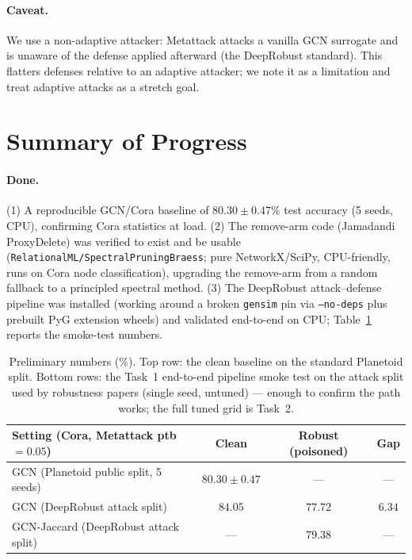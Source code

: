 \documentclass[10pt]{article}
\begin{document}
\paragraph{Caveat.} We use a non-adaptive attacker: Metattack attacks a vanilla GCN surrogate and is
unaware of the defense applied afterward (the DeepRobust standard). This flatters defenses relative to an
adaptive attacker; we note it as a limitation and treat adaptive attacks as a stretch goal.

\section{Summary of Progress}
\paragraph{Done.} (1) A reproducible GCN/Cora baseline of $\mathbf{80.30 \pm 0.47\%}$ test accuracy
(5 seeds, CPU), confirming Cora statistics at load. (2) The remove-arm code (Jamadandi ProxyDelete) was
verified to exist and be usable (\texttt{RelationalML/SpectralPruningBraess}; pure NetworkX/SciPy,
CPU-friendly, runs on Cora node classification), upgrading the remove-arm from a random fallback to a
principled spectral method. (3) The DeepRobust attack--defense pipeline was installed (working around a
broken \texttt{gensim} pin via \texttt{--no-deps} plus prebuilt PyG extension wheels) and validated
end-to-end on CPU; Table~\ref{tab:spike} reports the smoke-test numbers.

\begin{table}[h]
\centering
\small
\begin{tabular}{@{}lccc@{}}
\toprule
\textbf{Setting (Cora, Metattack ptb $=0.05$)} & \textbf{Clean} & \textbf{Robust (poisoned)} & \textbf{Gap} \\
\midrule
GCN (Planetoid public split, 5 seeds)  & $80.30 \pm 0.47$ & --- & --- \\
GCN (DeepRobust attack split)          & $84.05$ & $77.72$ & $6.34$ \\
GCN-Jaccard (DeepRobust attack split)  & ---     & $79.38$ & --- \\
\bottomrule
\end{tabular}
\caption{Preliminary numbers (\%). Top row: the clean baseline on the standard Planetoid split. Bottom
rows: the Task~1 end-to-end pipeline smoke test on the attack split used by robustness papers (single
seed, untuned) --- enough to confirm the path works; the full tuned grid is Task~2.}
\label{tab:spike}
\end{table}
\end{document}
